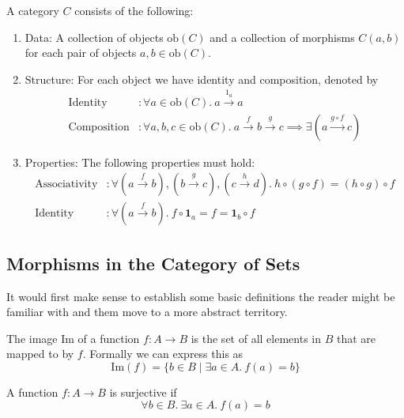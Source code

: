 \documentclass[10pt]{article}
\begin{document}
\begin{definition}[Category]
  A category $C$ consists of the following:
  \begin{enumerate}
    \item Data: A collection of objects $\text{ob}(C)$ and a collection of morphisms $C (a, b)$ for each pair of objects $a, b \in \text{ob}(C)$.
    \item Structure: For each object we have identity and composition, denoted by
      \[
        \begin{aligned}
          \text{Identity} & : \forall a \in \text{ob}(C).\ a \xrightarrow{\text{1}_a} a \\
          \text{Composition} & : \forall a, b, c \in \text{ob}(C).\ a \xrightarrow{f} b \xrightarrow{g} c\implies  \exists (a \xrightarrow{g \circ f} c)
        \end{aligned}
      \]
    \item Properties: The following properties must hold:
      \[
        \begin{aligned}
          \text{Associativity} & : \forall (a \xrightarrow{f} b), (b \xrightarrow g c), (c \xrightarrow h d).\ h \circ (g \circ f) = (h \circ g) \circ f \\
          \text{Identity} & : \forall (a \xrightarrow{f} b).\ f \circ \textbf{1}_a = f = \textbf{1}_b \circ f
        \end{aligned}
      \]
  \end{enumerate}
\end{definition}

\subsection{Morphisms in the Category of Sets}

It would first make sense to establish some basic definitions the reader might be familiar with and them move to a more abstract territory.

\begin{definition}[Image]
  The image $\text{Im}$ of a function $f : A \rightarrow B$ is the set of all elements in $B$ that are mapped to by $f$. Formally we can express this as
  \[
    \text{Im}(f) = \{b \in B \mid \exists a \in A.\ f(a) = b\}
  \]

\end{definition}

\begin{definition}[Surjective]
  A function $f : A \rightarrow B$ is surjective if
  \[
    \forall b \in B.\ \exists a \in A.\  f(a) = b
  \]
\end{definition}
\end{document}
